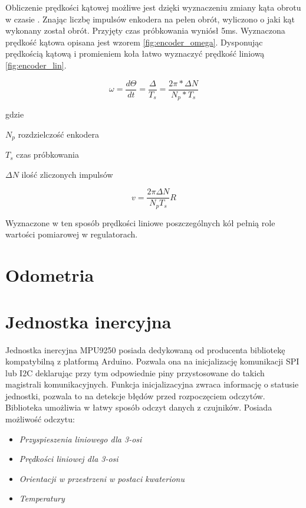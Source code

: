 Obliczenie prędkości kątowej możliwe jest dzięki wyznaczeniu zmiany kąta obrotu w czasie \cite{encoder_velocity}. Znając liczbę impulsów enkodera na pełen obrót, wyliczono o jaki kąt wykonany został obrót. Przyjęty czas próbkowania wyniósł 5ms. Wyznaczona prędkość kątowa opisana jest wzorem \ref{fig:encoder_omega}. Dysponując prędkością kątową i promieniem koła łatwo wyznaczyć prędkość liniową \ref{fig:encoder_lin}.

\begin{equation}
\omega = \frac{d\Theta}{dt} = \frac{\Delta}{T_s}=\frac{2\pi * \Delta N}{N_p * T_s}
\label{fig:encoder_omega}
\end{equation}

gdzie
\begin{eqwhere}[2cm]
	\item[$N_p$] rozdzielczość enkodera
	\item[$T_s$] czas próbkowania
	\item[$\Delta N$] ilość zliczonych impulsów  
\end{eqwhere}

\begin{equation}
v =\frac{2\pi \Delta N }{N_pT_s}R
\label{fig:encoder_lin}
\end{equation}

Wyznaczone w ten sposób prędkości liniowe poszczególnych kół pełnią role wartości pomiarowej w regulatorach. 
\section{Odometria}
\section{Jednostka inercyjna} 

Jednostka inercyjna MPU9250 posiada dedykowaną od producenta bibliotekę kompatybilną z platformą Arduino. Pozwala ona na inicjalizację komunikacji SPI lub I2C deklarując przy tym odpowiednie piny przystosowane do takich magistrali komunikacyjnych. Funkcja inicjalizacyjna zwraca informację o statusie jednostki, pozwala to na detekcje błędów przed rozpoczęciem odczytów. Biblioteka umożliwia w łatwy sposób odczyt danych z czujników. Posiada możliwość odczytu:
\begin{itemize}
	\item
	\textit{Przyspieszenia liniowego dla 3-osi }
	\item
	\textit{Prędkości liniowej dla 3-osi}
	\item 
	\textit{Orientacji w przestrzeni w postaci kwaterionu}
	\item 
	\textit{Temperatury} 
\end{itemize}
